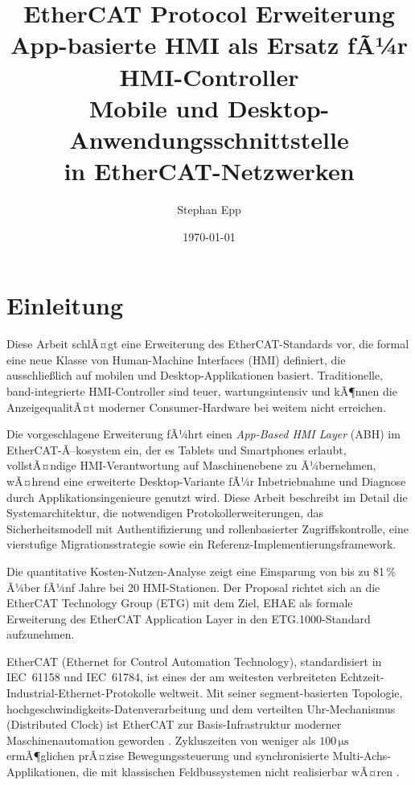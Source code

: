 ﻿\documentclass[12pt,a4paper]{article}
\title{
  \textbf{\LARGE EtherCAT Protocol Erweiterung}\\
  \textbf{\Large App-basierte HMI als Ersatz fÃ¼r HMI-Controller}\\[0.4cm]
  \large Mobile und Desktop-Anwendungsschnittstelle\\
   in EtherCAT-Netzwerken\\[0.3cm]
}
\author{Stephan Epp}
\date{\today}
\begin{document}
\maketitle
\thispagestyle{empty}


\tableofcontents
\newpage

\section{Einleitung}
\label{sec:intro}
Diese Arbeit schlÃ¤gt eine Erweiterung des EtherCAT-Standards vor, die formal eine neue
Klasse von Human-Machine Interfaces (HMI) definiert, die ausschlie\ss{}lich auf mobilen und
Desktop-Applikationen basiert. Traditionelle, band-integrierte HMI-Controller sind teuer,
wartungsintensiv und kÃ¶nnen die AnzeigequalitÃ¤t moderner Consumer-Hardware bei weitem
nicht erreichen.

Die vorgeschlagene Erweiterung fÃ¼hrt einen \emph{App-Based HMI Layer} (ABH) im
EtherCAT-Ã–kosystem ein, der es Tablets und Smartphones erlaubt, vollstÃ¤ndige
HMI-Verantwortung auf Maschinenebene zu Ã¼bernehmen, wÃ¤hrend eine erweiterte
Desktop-Variante fÃ¼r Inbetriebnahme und Diagnose durch Applikationsingenieure genutzt
wird. Diese Arbeit beschreibt im Detail die Systemarchitektur, die notwendigen
Protokollerweiterungen, das Sicherheitsmodell mit Authentifizierung und rollenbasierter
Zugriffskontrolle, eine vierstufige Migrationsstrategie sowie ein Referenz-Implementierungsframework.

Die quantitative Kosten-Nutzen-Analyse zeigt eine Einsparung von bis zu 81\,\% Ã¼ber
fÃ¼nf Jahre bei 20 HMI-Stationen. Der Proposal richtet sich an die EtherCAT Technology
Group (ETG) mit dem Ziel, EHAE als formale Erweiterung des EtherCAT Application Layer
in den ETG.1000-Standard aufzunehmen.

EtherCAT (Ethernet for Control Automation Technology), standardisiert in IEC~61158 und
IEC~61784, ist eines der am weitesten verbreiteten Echtzeit-Industrial-Ethernet-Protokolle
weltweit. Mit seiner segment-basierten Topologie, hochgeschwindigkeits-Datenverarbeitung
und dem verteilten Uhr-Mechanismus (Distributed Clock) ist EtherCAT zur Basis-Infra\-struk\-tur
moderner Maschinenautomation geworden \cite{iec61158}. Zykluszeiten von weniger als
$100\,\si{\micro\second}$ ermÃ¶glichen prÃ¤zise Bewegungssteuerung und synchronisierte
Multi-Achs-Applikationen, die mit klassischen Feldbussystemen nicht realisierbar wÃ¤ren
\cite{etg_spec}.
\end{document}

